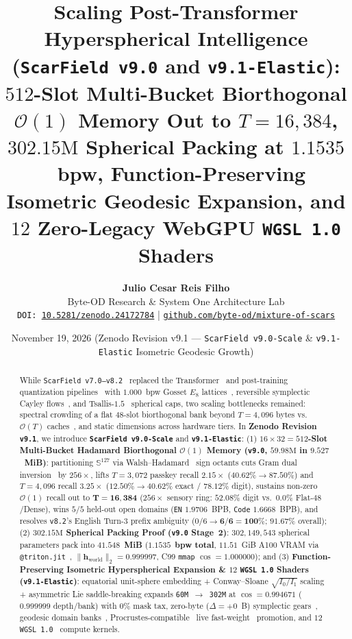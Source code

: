 \documentclass[10pt,twocolumn]{article}
\title{\textbf{Scaling Post-Transformer Hyperspherical Intelligence (\texttt{ScarField v9.0} and \texttt{v9.1-Elastic}):\\$512$-Slot Multi-Bucket Biorthogonal $\mathcal{O}(1)$ Memory Out to $T=16{,}384$, $302.15\text{M}$ Spherical Packing at $1.1535$~bpw, Function-Preserving Isometric Geodesic Expansion, and $12$ Zero-Legacy WebGPU \texttt{WGSL 1.0} Shaders}}
\author{
  \textbf{Julio Cesar Reis Filho}\\
  Byte-OD Research \& System One Architecture Lab\\
  \texttt{DOI: \href{https://doi.org/10.5281/zenodo.24172784}{10.5281/zenodo.24172784}} \quad|\quad
  \texttt{\href{https://github.com/byte-od/mixture-of-scars}{github.com/byte-od/mixture-of-scars}}
}
\date{November 19, 2026 \quad (Zenodo Revision v9.1 --- \texttt{ScarField v9.0-Scale} \& \texttt{v9.1-Elastic} Isometric Geodesic Growth)}
\begin{document}
\maketitle

\begin{abstract}
While \texttt{ScarField v7.0--v8.2}~\citep{reisfilho2026mos_zenodo,reisfilho2026qwen72b_mos_v2} replaced the Transformer~\citep{vaswani2017attention} and post-training quantization pipelines~\citep{dettmers2022llmint8,dettmers2023qlora,lin2024awq,li2024loftq,yuan2023asvd} with $1.000$~bpw Gosset $E_8$ lattices~\citep{viazovska2017sphere,kabatiansky1978bounds,conway1982fast}, reversible symplectic Cayley flows~\citep{hairer2006geometric,lipman2023flow,liu2023flow}, and Tsallis-$1.5$~\citep{tsallis1988possible,peters2019sparse} spherical caps, two scaling bottlenecks remained: spectral crowding of a flat $48$-slot biorthogonal bank beyond $T=4{,}096$ bytes vs.\ $\mathcal{O}(T)$ caches~\citep{xiao2024efficient,zhang2023h2o}, and static dimensions across hardware tiers. In \textbf{Zenodo Revision \texttt{v9.1}}, we introduce \textbf{\texttt{ScarField v9.0-Scale}} and \textbf{\texttt{v9.1-Elastic}}:
(1) \textbf{$16\times 32 = 512$-Slot Multi-Bucket Hadamard Biorthogonal $\mathcal{O}(1)$ Memory (\texttt{v9.0}, $59.98\text{M}$ in $9.527$~MiB)}: partitioning $\mathbb{S}^{127}$ via Walsh--Hadamard~\citep{walsh1923closed} sign octants cuts Gram dual inversion~\citep{leshem2000multichannel,meng2022locating,fang2025alphaedit} by $256\times$, lifts $T=3{,}072$ passkey recall $2.15\times$ ($40.62\% \to \mathbf{87.50\%}$) and $T=4{,}096$ recall $3.25\times$ ($12.50\% \to \mathbf{40.62\%}$ exact / $78.12\%$ digit), sustains non-zero $\mathcal{O}(1)$ recall out to $\mathbf{T=16{,}384}$ ($256\times$ sensory ring: $52.08\%$ digit vs.\ $0.0\%$ Flat-$48$/Dense), wins $5/5$ held-out open domains (\texttt{EN} $1.9706$~BPB, \texttt{Code} $1.6668$~BPB), and resolves \texttt{v8.2}'s English Turn-3 prefix ambiguity ($0/6 \to \mathbf{6/6 = 100\%}$; $91.67\%$ overall);
(2) \textbf{$302.15\text{M}$ Spherical Packing Proof (\texttt{v9.0} Stage~2)}: $302{,}149{,}543$ spherical parameters pack into $\mathbf{41.548}$~\textbf{MiB} ($\mathbf{1.1535}$~\textbf{bpw total}, $11.51$~GiB A100 VRAM via \texttt{@triton.jit}~\citep{tillet2019triton}, $\|\mathbf{h}_{\text{world}}\|_2 = 0.999997$, C99 \texttt{mmap} $\cos=1.000000$); and
(3) \textbf{Function-Preserving Isometric Hyperspherical Expansion \& $12$ \texttt{WGSL 1.0} Shaders (\texttt{v9.1-Elastic})}: equatorial unit-sphere embedding + Conway--Sloane $\sqrt{I_0/I_1}$ scaling + asymmetric Lie saddle-breaking expands \texttt{60M $\to$ 302M} at $\cos = \mathbf{0.994671}$ ($0.999999$ depth/bank) with $0\%$ mask tax, zero-byte ($\Delta=+0$~B) symplectic gears~\citep{leviathan2023fast,bengio2013estimating}, geodesic domain banks~\citep{ainsworth2023git,yu2020gradient,sinkhorn1967concerning,marchenko1967distribution}, Procrustes-compatible~\citep{schonemann1966generalized} live fast-weight~\citep{widrow1960adaptive,schmidhuber1992learning,schlag2021linear,bischof1987wy,yang2024parallelizing} promotion, and $12$ \texttt{WGSL 1.0}~\citep{w3c2024webgpu} compute kernels.
\end{abstract}
\end{document}
